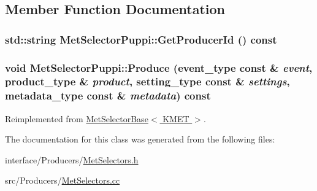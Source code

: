\subsection{Member Function Documentation}
\hypertarget{classMetSelectorPuppi_a3cd83a59f2fd82c5053e46ab1901bcee}{
\subsubsection[{GetProducerId}]{\setlength{\rightskip}{0pt plus 5cm}std::string MetSelectorPuppi::GetProducerId () const}}
\label{classMetSelectorPuppi_a3cd83a59f2fd82c5053e46ab1901bcee}
\hypertarget{classMetSelectorPuppi_a8271850e0ac5dfdfe20e403947f87c3d}{
\subsubsection[{Produce}]{\setlength{\rightskip}{0pt plus 5cm}void MetSelectorPuppi::Produce (event\_\-type const \& {\em event}, \/  product\_\-type \& {\em product}, \/  setting\_\-type const \& {\em settings}, \/  metadata\_\-type const \& {\em metadata}) const}}
\label{classMetSelectorPuppi_a8271850e0ac5dfdfe20e403947f87c3d}


Reimplemented from \hyperlink{classMetSelectorBase_a61da28f5d705a0e0a620879c7bf6a61c}{MetSelectorBase$<$ KMET $>$}.

The documentation for this class was generated from the following files:\begin{DoxyCompactItemize}
\item 
interface/Producers/\hyperlink{MetSelectors_8h}{MetSelectors.h}\item 
src/Producers/\hyperlink{MetSelectors_8cc}{MetSelectors.cc}\end{DoxyCompactItemize}
